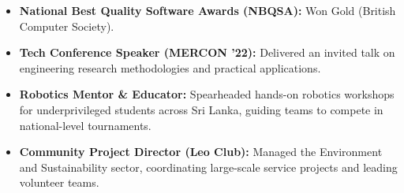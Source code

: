 \documentclass[letterpaper,10pt]{article}
\begin{document}
\begin{itemize}
    \item \textbf{National Best Quality Software Awards (NBQSA):} Won Gold (British Computer Society).
    \item \textbf{Tech Conference Speaker (MERCON '22):} Delivered an invited talk on engineering research methodologies and practical applications.
    \item \textbf{Robotics Mentor \& Educator:} Spearheaded hands-on robotics workshops for underprivileged students across Sri Lanka, guiding teams to compete in national-level tournaments.
    \item \textbf{Community Project Director (Leo Club):} Managed the Environment and Sustainability sector, coordinating large-scale service projects and leading volunteer teams.
\end{itemize}
\end{document}
